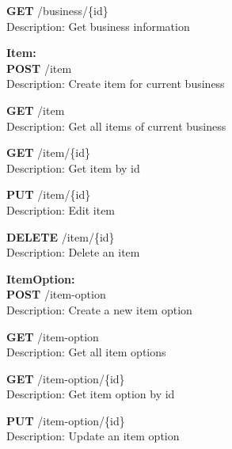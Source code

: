 \documentclass[11pt,a4paper,pdftex]{article}
\begin{document}
\hspace*{1em}\textbf{GET} /business/\{id\}\\
\hspace*{2em}Description: Get business information

\textbf{Item:}\\
\hspace*{1em}\textbf{POST} /item\\
\hspace*{2em}Description: Create item for current business

\hspace*{1em}\textbf{GET} /item\\
\hspace*{2em}Description: Get all items of current business

\hspace*{1em}\textbf{GET} /item/\{id\}\\
\hspace*{2em}Description: Get item by id

\hspace*{1em}\textbf{PUT} /item/\{id\}\\
\hspace*{2em}Description: Edit item

\hspace*{1em}\textbf{DELETE} /item/\{id\}\\
\hspace*{2em}Description: Delete an item

\textbf{ItemOption:}\\
\hspace*{1em}\textbf{POST} /item-option\\
\hspace*{2em}Description: Create a new item option

\hspace*{1em}\textbf{GET} /item-option\\
\hspace*{2em}Description: Get all item options

\hspace*{1em}\textbf{GET} /item-option/\{id\}\\
\hspace*{2em}Description: Get item option by id

\hspace*{1em}\textbf{PUT} /item-option/\{id\}\\
\hspace*{2em}Description: Update an item option
\end{document}
